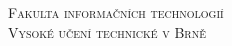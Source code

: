 \documentclass[11pt,titlepage]{article}
\title{}
\author{}
\date{\today}
\begin{document}
\begin{titlepage} %
  \makeatletter
  \begin{center}
    \LARGE
    \textsc{Fakulta informačních technologií \\ Vysoké učení technické v Brně}

    \Huge
    \@title

  \end{center}

  \large
  \@date \hfill \@author
  \makeatother
\end{titlepage}
\newpage %

\tableofcontents
\newpage


\end{document}
